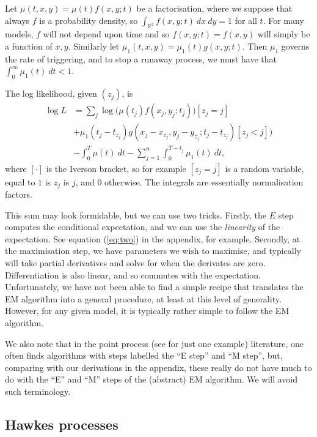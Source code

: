 \documentclass[twoside,a4paper]{article}
\theoremstyle{plain}
\theoremstyle{definition}
\begin{document}
Let $\mu(t,x,y) = \mu(t) f(x,y;t)$ be a factorisation, where we suppose that always
$f$ is a probability density, so $\int_{\mathbb R^2} f(x,y;t) \ dx \ dy = 1$ for all $t$.
For many models, $f$ will not depend upon time and so $f(x,y;t) = f(x,y)$ will simply be
a function of $x,y$.  Similarly let $\mu_1(t,x,y) = \mu_1(t) g(x,y;t)$.  Then $\mu_1$
governs the rate of triggering, and to stop a runaway process, we must have that
$\int_0^\infty \mu_1(t) \ dt < 1$.

The log likelihood, given $(z_j)$, is
\begin{align*}
\log L &= \sum_j \log\Big(\mu(t_j) f(x_j,y_j;t_j)) [z_j=j] \\
&+ \mu_1(t_j - t_{z_j}) g(x_j - x_{z_j}, y_j - y_{z_j};t_j - t_{z_j}) [z_j<j] \Big) \\
&- \int_0^T \mu(t) \ dt - \sum_{j=1}^n \int_0^{T-t_j} \mu_1(t) \ dt,
\end{align*}
where $[\cdot]$ is the Iverson bracket, so for example $[z_j=j]$ is a random variable,
equal to $1$ is $z_j$ is $j$, and $0$ otherwise.  The integrals are essentially
normalisation factors.

This sum may look formidable, but we can use two tricks.  Firstly, the $E$ step
computes the conditional expectation, and we can use the \emph{linearity} of
the expectation.  See equation (\ref{eq:two}) in the appendix, for example.
Secondly, at the maximisation step, we have parameters we wish to maximise, and typically
will take partial derivatives and solve for when the derivates are zero.  Differentiation
is also linear, and so commutes with the expectation.  Unfortunately, we have not been
able to find a simple recipe that translates the EM algorithm into a general procedure,
at least at this level of generality.  However, for any given model, it is typically
rather simple to follow the EM algorithm.

We also note that in the point process (see \cite[page~1402]{sepp2} for just one example)
literature, one often finds algorithms with steps labelled the ``E step'' and ``M step'',
but, comparing with our derivations in the appendix, these really do not have much to do
with the ``E'' and ``M'' steps of the (abstract) EM algorithm.  We will avoid such terminology.


\subsection{Hawkes processes}
\end{document}
